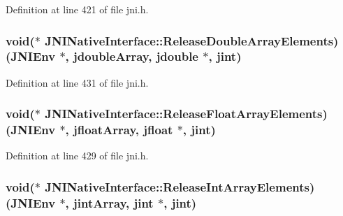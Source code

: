 Definition at line 421 of file jni.\-h.

\hypertarget{struct_j_n_i_native_interface_a0b8c3530aa1932aaa15053827521ee8b}{
\subsubsection[{Release\-Double\-Array\-Elements}]{\setlength{\rightskip}{0pt plus 5cm}void($\ast$ J\-N\-I\-Native\-Interface\-::\-Release\-Double\-Array\-Elements)({\bf J\-N\-I\-Env} $\ast$, {\bf jdouble\-Array}, {\bf jdouble} $\ast$, {\bf jint})}}\label{struct_j_n_i_native_interface_a0b8c3530aa1932aaa15053827521ee8b}


Definition at line 431 of file jni.\-h.

\hypertarget{struct_j_n_i_native_interface_ab09d4e7ffb93925fe1fa1d3fe83f3627}{
\subsubsection[{Release\-Float\-Array\-Elements}]{\setlength{\rightskip}{0pt plus 5cm}void($\ast$ J\-N\-I\-Native\-Interface\-::\-Release\-Float\-Array\-Elements)({\bf J\-N\-I\-Env} $\ast$, {\bf jfloat\-Array}, {\bf jfloat} $\ast$, {\bf jint})}}\label{struct_j_n_i_native_interface_ab09d4e7ffb93925fe1fa1d3fe83f3627}


Definition at line 429 of file jni.\-h.

\hypertarget{struct_j_n_i_native_interface_a81727e86947b406498c4e53d19d49f9f}{
\subsubsection[{Release\-Int\-Array\-Elements}]{\setlength{\rightskip}{0pt plus 5cm}void($\ast$ J\-N\-I\-Native\-Interface\-::\-Release\-Int\-Array\-Elements)({\bf J\-N\-I\-Env} $\ast$, {\bf jint\-Array}, {\bf jint} $\ast$, {\bf jint})}}\label{struct_j_n_i_native_interface_a81727e86947b406498c4e53d19d49f9f}


